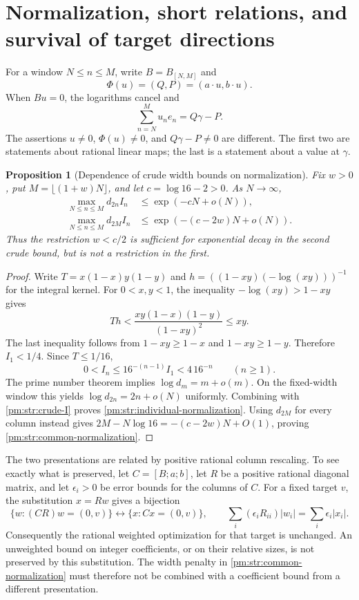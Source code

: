 \documentclass[11pt,a4paper]{article}
\newtheorem{proposition}[theorem]{Proposition}
\theoremstyle{definition}
\theoremstyle{remark}
\numberwithin{equation}{section}
\begin{document}
\section{Normalization, short relations, and survival of target directions}
\label{pm:str:sec-escape}

For a window $N\leq n\leq M$, write $B=B_{[N,M]}$ and
\[
 \Phi(u)=(Q,P)=(a\mathbin{\cdot}u,b\mathbin{\cdot}u).
\]
When $Bu=0$, the logarithms cancel and
\begin{equation}\label{pm:str:target-value}
 \sum_{n=N}^M u_ne_n=Q\gamma-P.
\end{equation}
The assertions $u\ne0$, $\Phi(u)\ne0$, and $Q\gamma-P\ne0$ are
different.  The first two are statements about rational linear maps;
the last is a statement about a value at $\gamma$.

\begin{proposition}[Dependence of crude width bounds on normalization]
\label{pm:str:normalization}
Fix $w>0$, put $M=\lfloor(1+w)N\rfloor$, and let
$c=\log16-2>0$.  As $N\to\infty$,
\begin{align}
 \max_{N\leq n\leq M}d_{2n}I_n
 &\leq\exp(-cN+o(N)),\label{pm:str:individual-normalization}\\
 \max_{N\leq n\leq M}d_{2M}I_n
 &\leq\exp(-(c-2w)N+o(N)).\label{pm:str:common-normalization}
\end{align}
Thus the restriction $w<c/2$ is sufficient for exponential decay in
the second crude bound, but is not a restriction in the first.
\end{proposition}

\begin{proof}
Write $T=x(1-x)y(1-y)$ and
$h=((1-xy)(-\log(xy)))^{-1}$ for the integral kernel.  For
$0<x,y<1$, the inequality $-\log(xy)>1-xy$ gives
\[
 Th<\frac{xy(1-x)(1-y)}{(1-xy)^2}\leq xy.
\]
The last inequality follows from $1-xy\geq1-x$ and
$1-xy\geq1-y$.  Therefore $I_1<1/4$.  Since $T\leq1/16$,
\begin{equation}\label{pm:str:crude-I}
 0<I_n\leq16^{-(n-1)}I_1<4\,16^{-n}\qquad(n\geq1).
\end{equation}
The prime number theorem implies $\log d_m=m+o(m)$.
On the fixed-width window this yields $\log d_{2n}=2n+o(N)$
uniformly.  Combining with \eqref{pm:str:crude-I} proves
\eqref{pm:str:individual-normalization}.  Using $d_{2M}$ for every
column instead gives $2M-N\log16=-(c-2w)N+O(1)$, proving
\eqref{pm:str:common-normalization}.
\end{proof}

The two presentations are related by positive rational column
rescaling.  To see exactly what is preserved, let $C=[B;a;b]$,
let $R$ be a positive rational diagonal matrix, and let
$\epsilon_i>0$ be error bounds for the columns of $C$.
For a fixed target $v$, the substitution $x=Rw$ gives a bijection
\[
 \{w:(CR)w=(0,v)\}\longleftrightarrow
 \{x:Cx=(0,v)\},
 \qquad
 \sum_i(\epsilon_iR_{ii})|w_i|=\sum_i\epsilon_i|x_i|.
\]
Consequently the rational weighted optimization for that target is
unchanged.  An unweighted bound on integer coefficients, or on their
relative sizes, is not preserved by this substitution.  The width
penalty in \eqref{pm:str:common-normalization} must therefore not be
combined with a coefficient bound from a different presentation.
\end{document}
